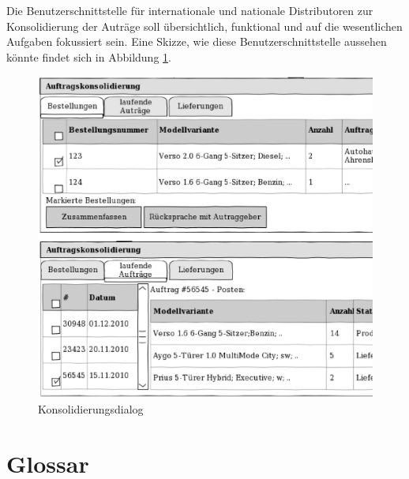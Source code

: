 \documentclass[a4paper,10pt]{article}
\begin{document}
Die Benutzerschnittstelle für internationale und nationale Distributoren zur Konsolidierung der Auträge soll übersichtlich, funktional und auf die wesentlichen Aufgaben fokussiert sein.
Eine Skizze, wie diese Benutzerschnittstelle aussehen könnte findet sich in Abbildung \ref{konsolidator}.

\begin{figure}[htb]
 \begin{center}
   \includegraphics[width=1\textwidth]{dialog_konsolidierung.eps}
    \caption{Konsolidierungsdialog}
    \label{konsolidator}
  \end{center}
\end{figure}


\section{Glossar}
\end{document}
